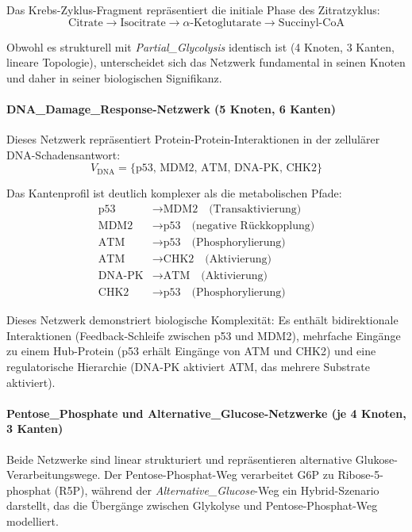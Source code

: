 ﻿\documentclass[a4paper,12pt]{article}
\theoremstyle{definition}
\begin{document}
Das Krebs-Zyklus-Fragment repräsentiert die initiale Phase des Zitratzyklus:
\[
\text{Citrate} \rightarrow \text{Isocitrate} \rightarrow \text{\(\alpha\)-Ketoglutarate} \rightarrow \text{Succinyl-CoA}
\]

Obwohl es strukturell mit \textit{Partial\_Glycolysis} identisch ist (4 Knoten, 3 Kanten, lineare Topologie), unterscheidet sich das Netzwerk fundamental in seinen Knoten und daher in seiner biologischen Signifikanz.

\paragraph{DNA\_Damage\_Response-Netzwerk (5 Knoten, 6 Kanten)}

Dieses Netzwerk repräsentiert Protein-Protein-Interaktionen in der zellulärer DNA-Schadensantwort:
\[
V_{\text{DNA}} = \{\text{p53, MDM2, ATM, DNA-PK, CHK2}\}
\]

Das Kantenprofil ist deutlich komplexer als die metabolischen Pfade:
\begin{align*}
	\text{p53} &\rightarrow \text{MDM2} \quad \text{(Transaktivierung)} \\
	\text{MDM2} &\rightarrow \text{p53} \quad \text{(negative Rückkopplung)} \\
	\text{ATM} &\rightarrow \text{p53} \quad \text{(Phosphorylierung)} \\
	\text{ATM} &\rightarrow \text{CHK2} \quad \text{(Aktivierung)} \\
	\text{DNA-PK} &\rightarrow \text{ATM} \quad \text{(Aktivierung)} \\
	\text{CHK2} &\rightarrow \text{p53} \quad \text{(Phosphorylierung)}
\end{align*}

Dieses Netzwerk demonstriert biologische Komplexität: Es enthält bidirektionale Interaktionen (Feedback-Schleife zwischen p53 und MDM2), mehrfache Eingänge zu einem Hub-Protein (p53 erhält Eingänge von ATM und CHK2) und eine regulatorische Hierarchie (DNA-PK aktiviert ATM, das mehrere Substrate aktiviert).

\paragraph{Pentose\_Phosphate und Alternative\_Glucose-Netzwerke (je 4 Knoten, 3 Kanten)}

Beide Netzwerke sind linear strukturiert und repräsentieren alternative Glukose-Verarbeitungswege. Der Pentose-Phosphat-Weg verarbeitet G6P zu Ribose-5-phosphat (R5P), während der \textit{Alternative\_Glucose}-Weg ein Hybrid-Szenario darstellt, das die Übergänge zwischen Glykolyse und Pentose-Phosphat-Weg modelliert.
\end{document}
